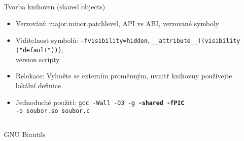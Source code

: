 \documentclass{beamer}
\begin{document}
\subsection{}
\begin{frame}{Tvorba knihoven (shared objects)}
\begin{itemize}
\item Verzování: major.minor.patchlevel, API vs ABI, verzované symboly
\item Viditelnost symbolů: {\tt -fvisibility=hidden}, {\tt \_\_attribute\_\_((visibility ("default")))}, \\ version scripty
\item Relokace: Vyhněte se externím proměnným, uvnitř knihovny používejte lokální definice
\item Jednoduché použití: {\tt gcc -Wall -O3 -g {\bf -shared -fPIC} \\ -o soubor.so soubor.c}
\end{itemize}
\end{frame}

\subsection{}
\begin{frame}{GNU Binutils}
\end{frame}

\lstset{basicstyle=\tiny\tt}
\end{document}
